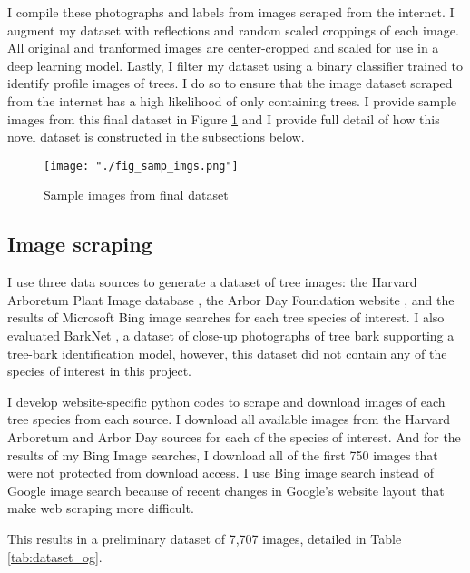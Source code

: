 \documentclass[10pt,twocolumn,letterpaper]{article}
\begin{document}
I compile these photographs and labels from images scraped from the internet. I augment my dataset with reflections and random scaled croppings of each image. All original and tranformed images are center-cropped and scaled for use in a deep learning model. Lastly, I filter my dataset using a binary classifier trained to identify profile images of trees. I do so to ensure that the image dataset scraped from the internet has a high likelihood of only containing trees. I provide sample images from this final dataset in Figure \ref{fig:samp_imgs} and I provide full detail of how this novel dataset is constructed in the subsections below.

\begin{figure}[!htbp]
  \centering
  \texttt{[image: "./fig\_samp\_imgs.png"]}
  \caption{\label{fig:samp_imgs} Sample images from final dataset}
\end{figure}

\subsection{Image scraping}

I use three data sources to generate a dataset of tree images: the Harvard Arboretum Plant Image database \cite{harvard}, the Arbor Day Foundation website \cite{arborday}, and the results of Microsoft Bing image searches for each tree species of interest. I also evaluated BarkNet \cite{Carpentier_2018}, a dataset of close-up photographs of tree bark supporting a tree-bark identification model, however, this dataset did not contain any of the species of interest in this project.

I develop website-specific python codes to scrape and download images of each tree species from each source. I download all available images from the Harvard Arboretum and Arbor Day sources for each of the species of interest. And for the results of my Bing Image searches, I download all of the first 750 images that were not protected from download access. I use Bing image search instead of Google image search because of recent changes in Google's website layout that make web scraping more difficult.

This results in a preliminary dataset of 7,707 images, detailed in Table \ref{tab:dataset_og}.
\end{document}
